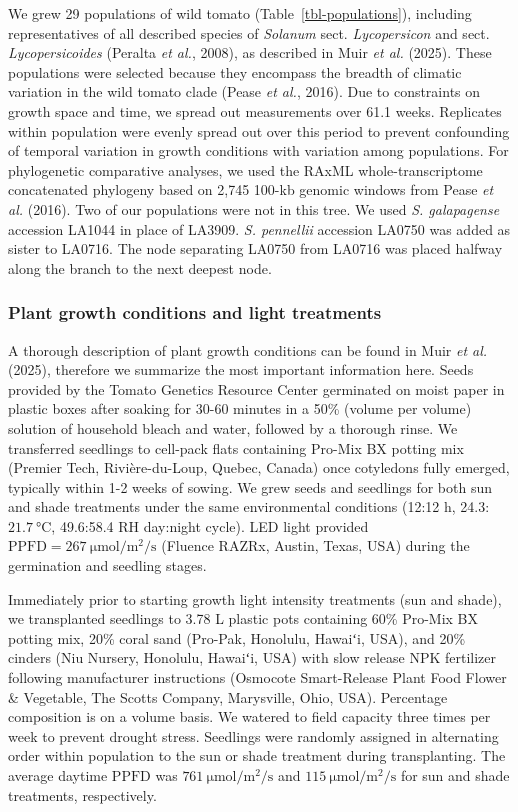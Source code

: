 \documentclass[
  letterpaper,
  DIV=11,
  numbers=noendperiod]{scrartcl}
\newcommand{\ppfd}{$\mathrm{PPFD}$}
\newcommand{\ppfdqty}[1]{$\SI{#1}{\micro\mole\per\meter\squared\per\second}$}
\begin{document}
We grew 29 populations of wild tomato (Table~\ref{tbl-populations}),
including representatives of all described species of \emph{Solanum}
sect. \emph{Lycopersicon} and sect. \emph{Lycopersicoides} (Peralta
\emph{et al.}, 2008), as described in Muir \emph{et al.} (2025). These
populations were selected because they encompass the breadth of climatic
variation in the wild tomato clade (Pease \emph{et al.}, 2016). Due to
constraints on growth space and time, we spread out measurements over
61.1 weeks. Replicates within population were evenly spread out over
this period to prevent confounding of temporal variation in growth
conditions with variation among populations. For phylogenetic
comparative analyses, we used the RAxML whole-transcriptome concatenated
phylogeny based on 2,745 100-kb genomic windows from Pease \emph{et al.}
(2016). Two of our populations were not in this tree. We used \emph{S.
galapagense} accession LA1044 in place of LA3909. \emph{S. pennellii}
accession LA0750 was added as sister to LA0716. The node separating
LA0750 from LA0716 was placed halfway along the branch to the next
deepest node.

\subsubsection{Plant growth conditions and light
treatments}\label{plant-growth-conditions-and-light-treatments}

A thorough description of plant growth conditions can be found in Muir
\emph{et al.} (2025), therefore we summarize the most important
information here. Seeds provided by the Tomato Genetics Resource Center
germinated on moist paper in plastic boxes after soaking for 30-60
minutes in a 50\% (volume per volume) solution of household bleach and
water, followed by a thorough rinse. We transferred seedlings to
cell-pack flats containing Pro-Mix BX potting mix (Premier Tech,
Rivière-du-Loup, Quebec, Canada) once cotyledons fully emerged,
typically within 1-2 weeks of sowing. We grew seeds and seedlings for
both sun and shade treatments under the same environmental conditions
(12:12 h, 24.3:\(\SI{21.7}{\degreeCelsius}\), 49.6:58.4 RH day:night
cycle). LED light provided
\(\mathrm{PPFD} = \SI{267}{\micro\mole\per\meter\squared\per\second}\)
(Fluence RAZRx, Austin, Texas, USA) during the germination and seedling
stages.

Immediately prior to starting growth light intensity treatments (sun and
shade), we transplanted seedlings to 3.78 L plastic pots containing 60\%
Pro-Mix BX potting mix, 20\% coral sand (Pro-Pak, Honolulu, Hawaiʻi,
USA), and 20\% cinders (Niu Nursery, Honolulu, Hawaiʻi, USA) with slow
release NPK fertilizer following manufacturer instructions (Osmocote
Smart-Release Plant Food Flower \& Vegetable, The Scotts Company,
Marysville, Ohio, USA). Percentage composition is on a volume basis. We
watered to field capacity three times per week to prevent drought
stress. Seedlings were randomly assigned in alternating order within
population to the sun or shade treatment during transplanting. The
average daytime \ppfd{} was \ppfdqty{761} and \ppfdqty{115} for sun and
shade treatments, respectively.
\end{document}

